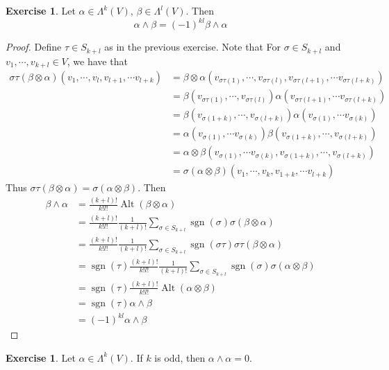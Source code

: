 \documentclass{book}
\theoremstyle{definition}
\newtheorem{ex}[definition]{Exercise}
\newcommand{\al}{\alpha}
\newcommand{\be}{\beta}
\newcommand{\sig}{\sigma}
\newcommand{\Lam}{\Lambda}
\DeclareMathOperator{\sgn}{sgn}
\DeclareMathOperator{\Alt}{Alt}
\DeclareMathOperator*{\0}{\mbf{0}}
\DeclareMathOperator*{\1}{\mbf{1}}
\begin{document}
	
	\begin{ex}
		Let $\al \in \Lam^k(V)$, $\be \in \Lam^l(V)$. Then $$\al \wedge \be = (-1)^{kl}\be \wedge \al$$
	\end{ex}

	\begin{proof}
		Define $\tau \in S_{k+l}$ as in the previous exercise. Note that For $\sig \in S_{k+l}$ and $v_1, \cdots, v_{k +l} \in V$, we have that 
		\begin{align*}
			\sig \tau (\be \otimes \al)(v_1, \cdots, v_l, v_{l+1}, \cdots v_{l+k}) 
			&= \be \otimes \al(v_{\sig \tau(1)}, \cdots, v_{\sig \tau(l)}, v_{\sig \tau(l+1)}, \cdots v_{\sig \tau(l+k)}) \\
			&= \be(v_{\sig \tau(1)}, \cdots, v_{\sig \tau(l)}) \al(v_{\sig \tau(l+1)}, \cdots v_{\sig \tau(l+k)}) \\
			&= \be(v_{\sig (1+k)}, \cdots, v_{\sig (l+k)}) \al(v_{\sig (1)}, \cdots v_{\sig (k)})\\ 
			&= \al(v_{\sig (1)}, \cdots v_{\sig (k)}) \be(v_{\sig (1+k)}, \cdots, v_{\sig (l+k)}) \\
			&= \al \otimes \be (v_{\sig (1)}, \cdots v_{\sig (k)}, v_{\sig (1+k)}, \cdots, v_{\sig (l+k)}) \\
			&= \sig (\al \otimes \be) (v_1, \cdots, v_k, v_{1+k}, \cdots v_{l+k})
		\end{align*}
		Thus $\sig \tau (\be \otimes \al) = \sig (\al \otimes \be)$. Then 
		\begin{align*}
			\be \wedge \al
			&= \frac{(k+l)!}{k!l!}\Alt(\be \otimes \al) \\
			&=  \frac{(k+l)!}{k!l!} \frac{1}{(k+l)!} \sum_{\sig \in S_{k+l}} \sgn(\sig) \sig (\be \otimes \al) \\
			&= \frac{(k+l)!}{k!l!} \frac{1}{(k+l)!} \sum_{\sig \in S_{k+l}} \sgn(\sig \tau) \sig \tau (\be \otimes \al) \\
			&= \sgn(\tau)\frac{(k+l)!}{k!l!} \frac{1}{(k+l)!} \sum_{\sig \in S_{k+l}} \sgn(\sig) \sig (\al \otimes \be) \\
			&= \sgn(\tau)\frac{(k+l)!}{k!l!}  \Alt(\al \otimes \be) \\
			&= \sgn(\tau) \al \wedge \be \\
			&= (-1)^{kl} \al \wedge \be
		\end{align*}
	 
	\end{proof}

	\begin{ex}
		Let $\al \in \Lam^k(V)$. If $k$ is odd, then $\al \wedge \al = 0$. 
	\end{ex}
\end{document}
